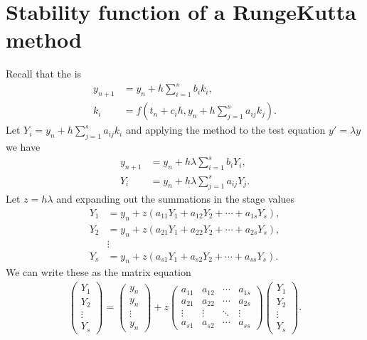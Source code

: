 \documentclass[letterpaper,10pt,english]{jupyterBook}
\begin{document}
\section{Stability function of a Runge\sphinxhyphen{}Kutta method}
\label{\detokenize{4_Stability/4.2_RK_stability_function:stability-function-of-a-runge-kutta-method}}\label{\detokenize{4_Stability/4.2_RK_stability_function::doc}}
\sphinxAtStartPar
Recall that the {\hyperref[\detokenize{2_ERKs/2.0_ERKs:rk-definition}]{}} is
\begin{align*}
    y_{n+1}&=y_n + h \sum_{i=1}^s b_i k_i ,\\
    k_i &=f(t_n +c_i h,y_n +h\sum_{j=1}^s a_{ij} k_j ).
\end{align*}
\sphinxAtStartPar
Let \(Y_i = y_n + h \displaystyle \sum_{j=1}^s a_{ij} k_i\) and applying the method to the test equation \(y' = \lambda y\) we have
\begin{align*}
    y_{n+1} &=y_n +h\lambda \sum_{i=1}^s b_i Y_i ,\\
    Y_i &=y_n +h\lambda \sum_{j=1}^s a_{ij} Y_j .
\end{align*}
\sphinxAtStartPar
Let \(z = h\lambda\) and expanding out the summations in the stage values
\begin{align*}
    Y_1 &=y_n +z(a_{11} Y_1 + a_{12} Y_2 + \cdots + a_{1s} Y_s),\\
    Y_2 &=y_n +z(a_{21} Y_1 + a_{22} Y_2 + \cdots + a_{2s} Y_s),\\
    &\vdots \\
    Y_s &=y_n +z(a_{s1} Y_1 + a_{s2} Y_2 + \cdots + a_{ss} Y_s).
\end{align*}
\sphinxAtStartPar
We can write these as the matrix equation
\begin{align*}
    \begin{pmatrix} Y_1 \\ Y_2 \\ \vdots \\ Y_s \end{pmatrix} = 
    \begin{pmatrix} y_n \\ y_n \\ \vdots \\ y_n \end{pmatrix}
    + z
    \begin{pmatrix}
        a_{11} & a_{12} & \cdots & a_{1s} \\
        a_{21} & a_{22} & \cdots & a_{2s} \\
        \vdots & \vdots & \ddots & \vdots \\
        a_{s1} & a_{s2} & \cdots & a_{ss}
    \end{pmatrix} 
    \begin{pmatrix} Y_1 \\ Y_2 \\ \vdots \\ Y_s \end{pmatrix}.
\end{align*}
\end{document}
